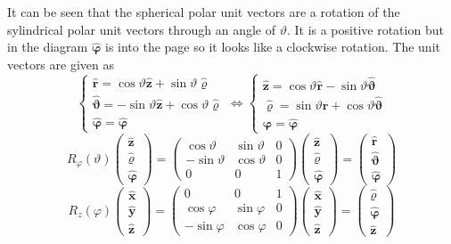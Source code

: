\documentclass{article}
\newcommand{\vh}[1]{\vec{\hat{#1}}}
\renewcommand{\vec}[1]{\bm{#1}}
\begin{document}
It can be seen that the spherical polar unit vectors are a rotation of the sylindrical polar unit vectors through an angle of \(\vartheta\). It is a positive rotation but in the diagram \(\vh\varphi\) is into the page so it looks like a clockwise rotation. The unit vectors are given as
\[\left\{
\begin{array}{l}
\vh r=\cos\vartheta\vh z+\sin\vartheta\vh\varrho\\
\vh\vartheta=-\sin\vartheta\vh z+\cos\vartheta\vh\varrho\\
\vh\varphi=\vh\varphi
\end{array}
\right.\iff\left\{
\begin{array}{l}
\vh z = \cos\vartheta\vh r-\sin\vartheta\vh\vartheta\\
\vh\varrho = \sin\vartheta\vh r+\cos\vartheta\vh\vartheta\\
\vh \varphi=\vh\varphi
\end{array}
\right.\]
\[R_\varphi(\vartheta)
\begin{pmatrix}
\vh z \\ \vh \varrho \\ \vh \varphi
\end{pmatrix}
=
\begin{pmatrix}
\cos\vartheta & \sin\vartheta & 0\\
-\sin\vartheta & \cos\vartheta & 0\\
0 & 0 & 1
\end{pmatrix}
\begin{pmatrix}
\vh z \\ \vh \varrho \\ \vh \varphi
\end{pmatrix}
=
\begin{pmatrix}
\vh r \\ \vh \vartheta \\ \vh \varphi
\end{pmatrix}
\]
\[R_z(\varphi)
\begin{pmatrix}
\vh x \\ \vh y \\ \vh z
\end{pmatrix}
=
\begin{pmatrix}
0 & 0 & 1\\
\cos\varphi & \sin\varphi & 0\\
-\sin\varphi & \cos\varphi & 0
\end{pmatrix}
\begin{pmatrix}
\vh x \\ \vh y \\ \vh z
\end{pmatrix}
=
\begin{pmatrix}
\vh \varrho \\ \vh \varphi \\ \vh z
\end{pmatrix}
\]
\end{document}
